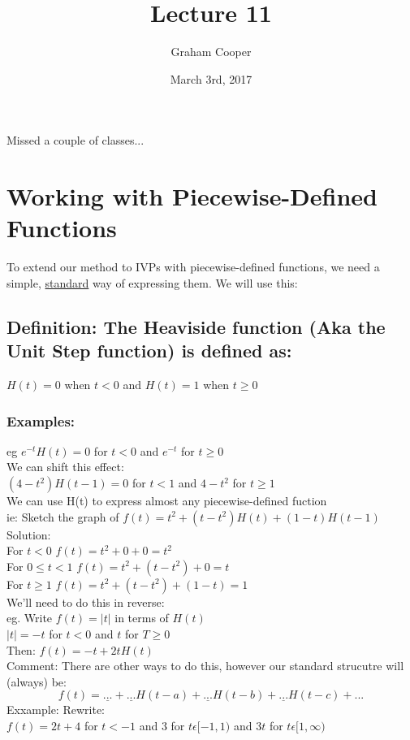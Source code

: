 \documentclass[12pt]{article}
\title{\vspace{-15ex}Lecture 11\vspace{-1ex}}
\date{March 3rd, 2017}
\author{Graham Cooper}
\begin{document}
	\maketitle
	
	Missed a couple of classes...
	
	\section*{Working with Piecewise-Defined Functions}
	To extend our method to IVPs with piecewise-defined functions, we need a simple, \underline{standard} way of expressing them. We will use this:\\
	
	\subsection*{Definition: The Heaviside function (Aka the Unit Step function) is defined as:}
	$H(t) = 0$ when $t < 0$ and $H(t) = 1$ when $t \ge 0$\\
	\subsubsection*{Examples:}
	eg $e^{-t}H(t) = 0$ for $t < 0$ and $e^{-t}$ for $t \ge 0$\\
	
	We can shift this effect:\\
	$(4 - t^2)H(t-1) = 0 $ for $t < 1$ and $4-t^2$ for $t \ge 1$\\
	
	We can use H(t) to express almost any piecewise-defined fuction\\
	
	ie: Sketch the graph of $f(t) = t^2 + (t-t^2)H(t) + (1-t)H(t-1)$\\
	Solution:\\
	For $t < 0$ $f(t) = t^2 + 0 + 0 = t^2$\\
	For $0 \le t < 1$ $f(t) = t^2 + (t-t^2) + 0 = t$\\
	For $t \ge 1$ $f(t) = t^2 + (t-t^2) + (1-t) = 1$\\
	
	We'll need to do this in reverse:\\
	eg. Write $f(t) = |t|$ in terms of $H(t)$\\
	$|t| = -t$ for $t < 0$ and $t$ for $T \ge 0$\\
	Then: $f(t) = -t + 2tH(t)$\\
	Comment: There are other ways to do this, however our standard strucutre will (always) be:
	$$f(t) = \underline{...} + \underline{...} H(t-a) + \underline{...} H(t-b) + \underline{...} H(t-c) + ...$$
	Exxample: Rewrite:\\
	$f(t) = 2t + 4$ for $t < -1$ and $3$ for $t \epsilon [-1, 1)$ and $3t$ for $t \epsilon [1, \infty)$\\
	
\end{document}

